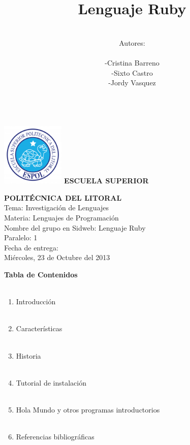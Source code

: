 \documentclass[11pt]{article} %
\title{\fontsize{30}{0} \bf Lenguaje Ruby}
\author{\\Autores: \\  \\-Cristina Barreno \\ -Sixto Castro \\ -Jordy Vasquez\\ \\}
\begin{document}
\newpage

 \includegraphics[width=3cm]{./imagenes/Espol.png}{ \fontsize{18}{0} \bf ESCUELA SUPERIOR \\}
\begin{center}
{\fontsize{18}{0} \bf POLITÉCNICA DEL LITORAL\\}
\vspace{2cm}
{\LARGE{ Tema: Investigación de Lenguajes }}\\
\vspace{2cm}
{\LARGE{ Materia: Lenguajes de Programación }}\\
\vspace{2cm}
{\LARGE{  Nombre del grupo en Sidweb: Lenguaje Ruby}}\\ 
\vspace{2cm}
{\LARGE{ Paralelo: 1}}\\
\vspace{2cm}
{\LARGE{Fecha de entrega: \\  Miércoles, 23 de Octubre del 2013}}

\end{center}


\maketitle

\newpage
{\hspace{3cm} \fontsize{20}{0} \bf  Tabla de Contenidos \\ \\}

\begin{enumerate}
\item {\fontsize{14}{0} Introducción\\ \\}
\item {\fontsize{14}{0} Características\\ \\}
\item {\fontsize{14}{0} Historia\\ \\}
\item {\fontsize{14}{0} Tutorial de instalación\\ \\}
\item Hola Mundo y otros programas introductorios\\ \\
\item Referencias bibliográficas\\ \\
\end{enumerate}
\end{document}
